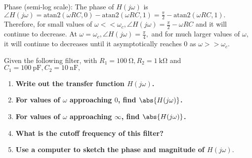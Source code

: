 \begin{enumerate}
{\begin{enumerate}[label=(\roman*)]
  Phase (semi-log scale): The phase of $H(j \omega)$ is $\angle{H(j\omega)} = \text{atan2}(\omega RC,0) - \text{atan2}(\omega RC, 1) = \frac{\pi}{2} - \text{atan2}(\omega RC, 1).$ Therefore, for small values of $\omega << \omega_{c}, \angle{H(j\omega)} = \frac{\pi}{2} - \omega RC$ and it will continue to decrease. At $\omega = \omega_{c}, \angle H(j \omega) = \frac{\pi}{4},$ and for much larger values of $\omega,$ it will continue to decreases until it asymptotically reaches $0$ as $\omega >> \omega_{c}.$


\end{enumerate}
}

\qitem Given the following filter, with $R_{1} = \SI{100}{\ohm}, R_{2} = \SI{1}{\kilo\ohm}$ and $C_{1} = \SI{100}{\pico\farad}, C_{2} = \SI{10}{\nano\farad},$



\begin{enumerate}[label=(\roman*)]
  \item \textbf{Write out the transfer function $H(j\omega)$.}
  \item \textbf{For values of $\omega$ approaching $0$, find $\abs{H(j\omega)}$.}
  \item \textbf{For values of $\omega$ approaching $\infty$, find $\abs{H(j\omega)}$.}
  \item \textbf{What is the cutoff frequency of this filter?}
  \item \textbf{Use a computer to sketch the phase and magnitude of $H(j \omega).$}
\end{enumerate}


\end{enumerate}
